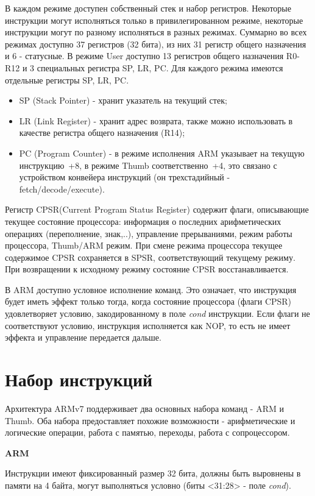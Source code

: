 В каждом режиме доступен собственный стек и набор регистров. Некоторые инструкции могут исполняться только в привилегированном режиме, некоторые инструкции могут по разному исполняться в разных режимах. Суммарно во всех режимах доступно 37 регистров (32 бита), из них 31 регистр общего назначения и 6 - статусные. В режиме User доступно 13 регистров общего назначения R0-R12 и 3 специальных регистра SP, LR, PC. Для каждого режима имеются отдельные регистры SP, LR, PC.

\begin{itemize}
    \item SP (Stack Pointer) - хранит указатель на текущий стек;
    \item LR (Link Register) - хранит адрес возврата, также можно использовать в качестве регистра общего назначения (R14);
    \item PC (Program Counter) - в режиме исполнения ARM указывает на текущую инструкцию~+8, в режиме Thumb соответственно~+4, это связано с устройством конвейера инструкций (он трехстадийный - fetch/decode/execute).
\end{itemize}

Регистр CPSR(Current Program Status Register) содержит флаги, описывающие текущее состояние процессора: информация о последних арифметических операциях (переполнение, знак,..), управление прерываниями, режим работы процессора, Thumb/ARM режим. При смене режима процессора текущее содержимое CPSR сохраняется в SPSR, соответствующий текущему режиму. При возвращении к исходному режиму состояние CPSR восстанавливается.

В ARM доступно условное исполнение команд. Это означает, что инструкция будет иметь эффект только тогда, когда состояние процессора (флаги CPSR) удовлетворяет условию, закодированному в поле {\it cond} инструкции. Если флаги не соответствуют условию, инструкция исполняется как NOP, то есть не имеет эффекта и управление передается дальше.

\section{Набор инструкций}

Архитектура ARMv7 поддерживает два основных набора команд - ARM и Thumb. Оба набора предоставляет похожие возможности - арифметические и логические операции, работа с памятью, переходы, работа с сопроцессором.

\textbf{ARM}

Инструкции имеют фиксированный размер 32 бита, должны быть выровнены в памяти на 4 байта, могут выполняться условно (биты <31:28> - поле \textit{cond}).

